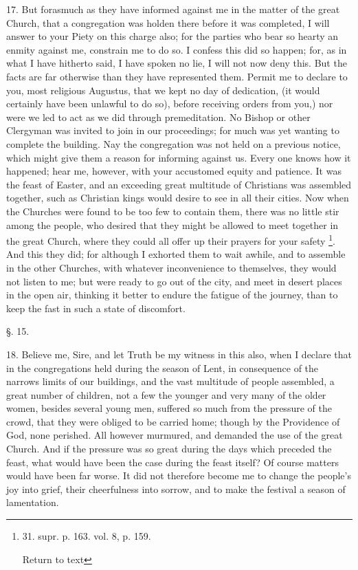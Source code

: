 17. But forasmuch as they have informed against me in the matter of the
great Church, that a congregation was holden there before it was
completed, I will answer to your Piety on this charge also; for the
parties who bear so hearty an enmity against me, constrain me to do
so. I confess this did so happen; for, as in what I have hitherto
said, I have spoken no lie, I will not now deny this. But the facts
are far otherwise than they have represented them. Permit me to
declare to you, most religious Augustus, that we kept no day of
dedication, (it would certainly have been unlawful to do so), before
receiving orders from you,) nor were we led to act as we did through
premeditation. No Bishop or other Clergyman was invited to join in our
proceedings; for much was yet wanting to complete the building. Nay
the congregation was not held on a previous notice, which might give
them a reason for informing against us. Every one knows how it
happened; hear me, however, with your accustomed equity and patience.
It was the feast of Easter, and an exceeding great multitude of
Christians was assembled together, such as Christian kings would
desire to see in all their cities. Now when the Churches were found to
be too few to contain them, there was no little stir among the people,
who desired that they might be allowed to meet together in the great
Church, where they could all offer up their prayers for your safety \footnote{31. supr. p. 163. vol. 8, p. 159.

Return to text}. And this they did; for although I exhorted them to wait
awhile, and to assemble in the other Churches, with whatever
inconvenience to themselves, they would not listen to me; but were
ready to go out of the city, and meet in desert places in the open
air, thinking it better to endure the fatigue of the journey, than to
keep the fast in such a state of discomfort.

§. 15.

18. Believe me, Sire, and let Truth be my witness in this also, when I
declare that in the congregations held during the season of Lent, in
consequence of the narrows limits of our buildings, and the vast
multitude of people assembled, a great number of children, not a few
the younger and very many of the older women, besides several young
men, suffered so much from the pressure of the crowd, that they were
obliged to be carried home; though by the Providence of God,
none perished. All however murmured, and demanded the use of the great
Church. And if the pressure was so great during the days which
preceded the feast, what would have been the case during the feast
itself? Of course matters would have been far worse. It did not
therefore become me to change the people's joy into grief, their
cheerfulness into sorrow, and to make the festival a season of
lamentation.

